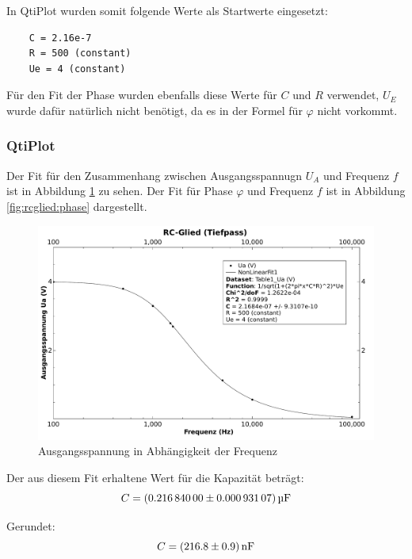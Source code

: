 In QtiPlot wurden somit folgende Werte als Startwerte eingesetzt:

\begin{verbatim}
    C = 2.16e-7
    R = 500 (constant)
    Ue = 4 (constant)
\end{verbatim}

F\"ur  den Fit  der  Phase wurden  ebenfalls  diese Werte  f\"ur  $C$ und  $R$
verwendet,  $U_E$ wurde  daf\"ur nat\"urlich  nicht ben\"otigt,  da es  in der
Formel f\"ur $\varphi$ nicht vorkommt.

\clearpage
\subsubsection{QtiPlot}

Der Fit  f\"ur den Zusammenhang  zwischen Ausgangsspannugn $U_A$  und Frequenz
$f$  ist  in  Abbildung  \ref{fig:rcglied:spannung} zu  sehen. Der  Fit  f\"ur
Phase  $\varphi$ und  Frequenz  $f$ ist  in Abbildung  \ref{fig:rcglied:phase}
dargestellt.

\begin{figure}[th!]
    \centering
    \includegraphics[width=.8\textwidth]{images/aufgabe5-betrag.pdf}
    \caption{Ausgangsspannung in Abh\"angigkeit der Frequenz}
    \label{fig:rcglied:spannung}
\end{figure}

Der aus diesem Fit erhaltene Wert f\"ur die Kapazit\"at betr\"agt:
\begin{equation*}
    C = \SI[separate-uncertainty = true]{0.21684 \pm 0.00093107}{\micro\farad}
\end{equation*}

Gerundet:
\begin{equation*}
    C = \SI[separate-uncertainty = true]{216.8 \pm 0.9}{\nano\farad}
\end{equation*}

